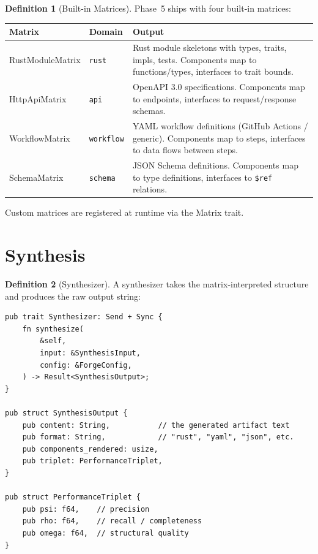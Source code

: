 \documentclass[11pt,a4paper,twoside]{article}
\theoremstyle{definition}
\newtheorem{definition}{Definition}[section]
\theoremstyle{plain}
\theoremstyle{remark}
\begin{document}
\begin{definition}[Built-in Matrices]\label{def:builtinmatrix}
Phase~5 ships with four built-in matrices:

\begin{tabularx}{\textwidth}{l l X}
\toprule
\textbf{Matrix} & \textbf{Domain} & \textbf{Output} \\
\midrule
RustModuleMatrix & \texttt{rust} & Rust module skeletons with types,
  traits, impls, tests. Components map to functions/types, interfaces
  to trait bounds. \\
HttpApiMatrix & \texttt{api} & OpenAPI 3.0 specifications. Components
  map to endpoints, interfaces to request/response schemas. \\
WorkflowMatrix & \texttt{workflow} & YAML workflow definitions
  (GitHub Actions / generic). Components map to steps, interfaces to
  data flows between steps. \\
SchemaMatrix & \texttt{schema} & JSON Schema definitions. Components
  map to type definitions, interfaces to \texttt{\$ref} relations. \\
\bottomrule
\end{tabularx}

Custom matrices are registered at runtime via the Matrix trait.
\end{definition}


\section{Synthesis}\label{sec:forge:synth}

\begin{definition}[Synthesizer]\label{def:synth}
A synthesizer takes the matrix-interpreted structure and produces
the raw output string:
\begin{lstlisting}
pub trait Synthesizer: Send + Sync {
    fn synthesize(
        &self,
        input: &SynthesisInput,
        config: &ForgeConfig,
    ) -> Result<SynthesisOutput>;
}

pub struct SynthesisOutput {
    pub content: String,           // the generated artifact text
    pub format: String,            // "rust", "yaml", "json", etc.
    pub components_rendered: usize,
    pub triplet: PerformanceTriplet,
}

pub struct PerformanceTriplet {
    pub psi: f64,    // precision
    pub rho: f64,    // recall / completeness
    pub omega: f64,  // structural quality
}
\end{lstlisting}
\end{definition}
\end{document}
